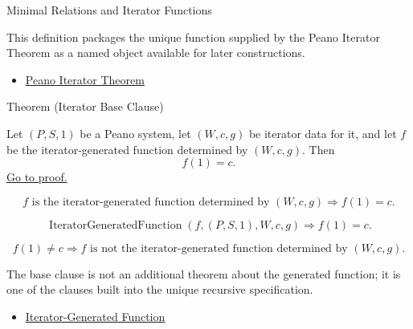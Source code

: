 \begin{topicbox}{Minimal Relations and Iterator Functions}
\begin{remark*}[Interpretation]
This definition packages the unique function supplied by the Peano Iterator
Theorem as a named object available for later constructions.
\end{remark*}

\begin{dependencies}
\begin{itemize}
  \item \hyperref[thm:peano-iterator-theorem]{Peano Iterator Theorem}
\end{itemize}
\end{dependencies}

\begin{theorembox}{Theorem (Iterator Base Clause)}
\begin{theorem}
\label{thm:iterator-base-value}
Let $(P,S,1)$ be a Peano system, let $(W,c,g)$ be iterator data for it, and let
$f$ be the iterator-generated function determined by $(W,c,g)$. Then
\[
f(1)=c.
\]
\hyperref[prf:iterator-base-value]{Go to proof.}
\end{theorem}
\end{theorembox}

\begin{remark*}
\[
f \text{ is the iterator-generated function determined by } (W,c,g)
\Longrightarrow f(1)=c.
\]
\end{remark*}

\begin{remark*}
\[
\operatorname{IteratorGeneratedFunction}(f,(P,S,1),W,c,g)
\Longrightarrow f(1)=c.
\]
\end{remark*}

\begin{remark*}
\[
f(1)\neq c
\Longrightarrow
f \text{ is not the iterator-generated function determined by } (W,c,g).
\]
\end{remark*}

\begin{remark*}[Interpretation]
The base clause is not an additional theorem about the generated function; it
is one of the clauses built into the unique recursive specification.
\end{remark*}

\begin{dependencies}
\begin{itemize}
  \item \hyperref[def:iterator-generated-function]{Iterator-Generated Function}
\end{itemize}
\end{dependencies}


\end{topicbox}
